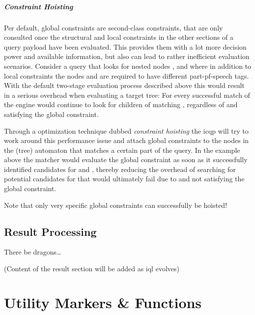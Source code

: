 \documentclass[11pt,a4paper]{report}
\begin{document}
\paragraph{Constraint Hoisting}
Per default, global constraints are second-class constraints, that are only consulted once the structural and local constraints in the other sections of a query payload have been evaluated.
This provides them with a lot more decision power and available information, but also can lead to rather inefficient evaluation scenarios.
Consider a query  that looks for nested nodes ,  and  where in addition to local constraints the nodes  and  are required to have different part-pf-speech tags.
With the default two-stage evaluation process described above this would result in a serious overhead when evaluating a target tree: 
For every successful match of \query{[\$x:~[\$y:]]} the engine would continue to look for children of  matching , regardless of  and  satisfying the global constraint.

Through a optimization technique dubbed \textit{constraint hoisting} the \ac{icqp} will try to work around this performance issue and attach global constraints to the nodes in the (tree) automaton that matches a certain part of the query.
In the example above the matcher would evaluate the global constraint  as soon as it successfully identified candidates for  and , thereby reducing the overhead of searching for potential candidates for  that would ultimately fail due to  and  not satisfying the global constraint.

Note that only very specific global constraints can successfully be hoisted! 

\section{Result Processing}
\label{sec:result-processing}

There be dragons\dots

(Content of the result section will be added as \ac{iql} evolves)

\chapter{Utility Markers \& Functions}
\label{chap:utility}
\end{document}
